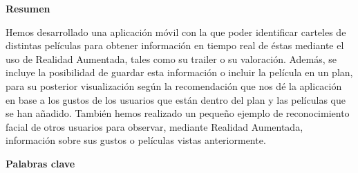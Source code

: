 
\newpage

\thispagestyle{empty}

\begin{center}

{\bf \Huge Resumen}

  \end{center}
\vspace{1cm}

Hemos desarrollado una aplicación móvil con la que poder identificar
carteles de distintas películas para obtener información en tiempo real de
éstas mediante el uso de Realidad Aumentada, tales como su trailer o su valoración. Además,
se incluye la posibilidad de guardar esta información o incluir la película en un plan, para 
su posterior visualización según la recomendación que nos dé la aplicación en base a 
los gustos de los usuarios que están dentro del plan y las películas que se han añadido. 
También hemos realizado un pequeño ejemplo de reconocimiento facial de otros usuarios para observar, 
mediante Realidad Aumentada, información sobre sus gustos o películas vistas anteriormente.

\vspace{1cm}


\begin{center}

{\bf \Large Palabras clave}

   \end{center}

   \vspace{0.5cm}
   
